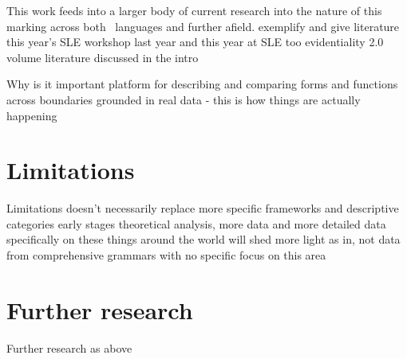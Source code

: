 This work feeds into a larger body of current research into the nature of this marking across both \lfam\ languages and further afield. exemplify and give literature
this year's SLE workshop
last year and this year at SLE too
evidentiality 2.0 volume
literature discussed in the intro

Why is it important 
platform for describing and comparing forms and functions across boundaries
grounded in real data - this is how things are actually happening

\section{Limitations}
Limitations
doesn't necessarily replace more specific frameworks and descriptive categories
early stages theoretical analysis, more data and more detailed data specifically on these things around the world will shed more light
    as in, not data from comprehensive grammars with no specific focus on this area

\section{Further research}
Further research
as above